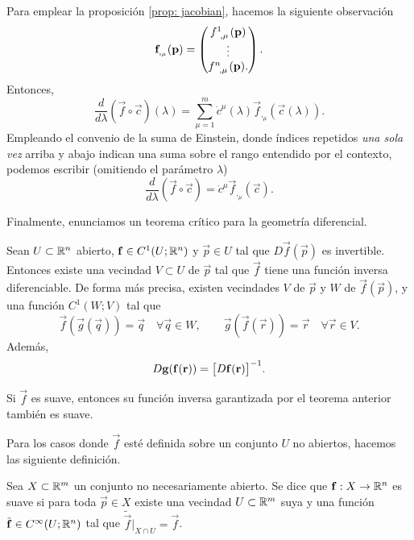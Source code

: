 \begin{remark}
	Para emplear la proposición \ref{prop: jacobian}, hacemos la siguiente observación
	\begin{equation}
		\vec f_{,_\mu}(\vec p) = \Matrix{
			f\indices{^1_{,\mu}}(\vec p) \\
			\vdots \\
			f\indices{^n_{,\mu}}(\vec p).
		}.
	\end{equation}
	Entonces,
	\begin{equation}
		\frac{d}{d\lambda}(\vec f \circ \vec c)(\lambda) = \sum_{\mu=1}^m \dot c^\mu(\lambda)\vec f_{,_\mu}(\vec c(\lambda)).
	\end{equation}
	Empleando el convenio de la suma de Einstein, donde índices repetidos \emph{una sola vez} arriba y abajo indican una suma sobre el rango entendido por el contexto, podemos escribir (omitiendo el parámetro $\lambda$)
	\begin{equation}
		\frac{d}{d\lambda}(\vec f \circ \vec c) = \dot c^\mu \vec f_{,_\mu}(\vec c).
	\end{equation}
\end{remark}

Finalmente, enunciamos un teorema crítico para la geometría diferencial.
\begin{theorem}
	Sean $U\subset \mathbb R^n$ abierto, $\mathbf f \in C^1(U; \mathbb R^n)$ y $\vec p \in U$ tal que $D\vec f(\vec p)$ es invertible. Entonces existe una vecindad $V \subset U$ de $\vec p$ tal que $\vec f$ tiene una función inversa diferenciable. De forma más precisa, existen vecindades $V$ de $\vec p$ y $W$ de $\vec f(\vec p)$, y una función $C^1(W; V)$ tal que
	\begin{equation}
		\vec f(\vec g(\vec q)) = \vec q \quad \forall \vec q \in W, \qquad \vec g(\vec f(\vec r)) = \vec r \quad \forall \vec r \in V.
	\end{equation}
	Además,
	\begin{equation}
		D\mathbf g(\mathbf f(\mathbf r)) = \bigl[D\mathbf f(\mathbf r) \bigr]^{-1}.
	\end{equation}
\end{theorem}
\begin{proposition}
	Si $\vec f$ es suave, entonces su función inversa garantizada por el teorema anterior también es suave.
\end{proposition}

Para los casos donde $\vec f$ esté definida sobre un conjunto $U$ no abiertos, hacemos las siguiente definición.
\begin{definition}
	Sea $X \subset \mathbb R^m$ un conjunto no necesariamente abierto. Se dice que $\mathbf f: X \to \mathbb R^n$  es suave si para toda $\vec p \in X$ existe una vecindad $U \subset \mathbb R^m$ suya y una función $\tilde{\mathbf f} \in C^\infty(U; \mathbb R^n)$ tal que $\tilde{\vec f}\rvert_{X\cap U} = {\vec f}$.
\end{definition}

